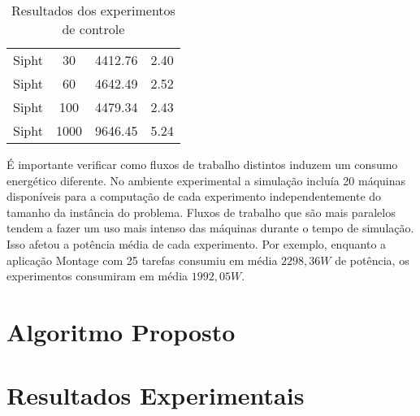 \begin{table}
\begin{tabular}{|c|c|c|c|}
    Sipht                          & 30                & 4412.76            & 2.40                     \\
    Sipht                          & 60                & 4642.49            & 2.52                     \\
    Sipht                          & 100               & 4479.34            & 2.43                     \\
    Sipht                          & 1000              & 9646.45            & 5.24                     \\ \hline
    \end{tabular}
    \caption {Resultados dos experimentos de controle}
    \label{tab:resultados_dvfs}
\end{table}

É importante verificar como fluxos de trabalho distintos induzem um consumo
energético diferente. No ambiente experimental a simulação incluía 20 máquinas
disponíveis para a computação de cada experimento independentemente
do tamanho da instância do problema. Fluxos de trabalho que são
mais paralelos tendem a fazer um uso mais intenso das máquinas durante o tempo
de simulação. Isso afetou a potência média de cada experimento. Por exemplo,
enquanto a aplicação Montage com 25 tarefas consumiu em média $2298,36W$ de
potência, os experimentos consumiram em média $1992,05W$.



\section{Algoritmo Proposto}
\label{sec:algoritmo_proposto}

\section{Resultados Experimentais}
\label{sec:resultados_experimentais}

